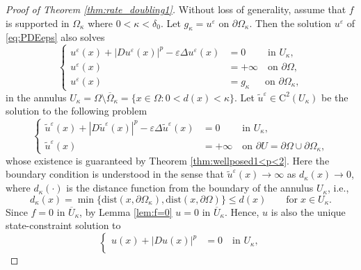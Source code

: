 \documentclass[12pt,reqno]{amsart}
\numberwithin{figure}{section}
\theoremstyle{plain}
\theoremstyle{remark}
\numberwithin{equation}{section}
\begin{document}
\begin{proof}[Proof of Theorem \ref{thm:rate_doubling1}] Without loss of generality, assume that $f$ is supported in $\Omega_\kappa$ where $0<\kappa < \delta_{0}$.
Let $g_\kappa = u^\varepsilon$ on $\partial\Omega_{\kappa}$. Then the solution $u^\varepsilon$ of \eqref{eq:PDEeps} also solves
\begin{equation*}
    \left\{
  \begin{aligned}
  u^\varepsilon(x) + |Du^\varepsilon(x)|^p-\varepsilon \Delta u^\varepsilon(x) &=0 \;\qquad \text{in } U_\kappa ,\\
  u^\varepsilon(x) &= +\infty \quad \text{on } \partial \Omega,\\
  u^\varepsilon(x) &= g_\kappa \;\;\quad \text{on } \partial \Omega_{\kappa},
    \end{aligned}
\right.
\end{equation*}
in the annulus $U_\kappa= \Omega \setminus \overline{\Omega}_{\kappa} = \{x\in \Omega: 0< d(x) < \kappa\}$. Let $\tilde{u}^\varepsilon\in \mathrm{C}^2(U_\kappa)$ be the solution to the following problem
\begin{equation*}
    \left\{
        \begin{aligned}
            \tilde{u}^\varepsilon(x) + |D\tilde{u}^\varepsilon(x)|^p-\varepsilon \Delta \tilde{u}^\varepsilon(x) &=0 \;\qquad \text{in } U_\kappa ,\\
            \tilde{u}^\varepsilon(x) &= +\infty \quad \text{on } \partial U = \partial \Omega\cup \partial \Omega_{\kappa},
        \end{aligned}
    \right.
\end{equation*}
whose existence is guaranteed by Theorem \ref{thm:wellposed1<p<2}.
Here the boundary condition is understood in the sense that $\tilde{u}^\varepsilon(x)\to \infty$ as $d_\kappa(x)\to 0$, where $d_\kappa(\cdot)$ is the distance function from the boundary of the annulus $U_\kappa$, i.e.,
\begin{equation*}
    d_\kappa(x) = \min \big\lbrace \mathrm{dist}(x,\partial \Omega_\kappa),\mathrm{dist}(x,\partial\Omega)  \big\rbrace \leq d(x) \qquad\text{for}\;x\in U_\kappa.
\end{equation*}
Since $f = 0$ in $\overline{U}_\kappa$, by Lemma \ref{lem:f=0} $u=0$ in $\overline{U}_\kappa$. Hence, $u$ is also the unique state-constraint solution to
\begin{equation*}
    \left\{
        \begin{aligned}
            u(x)+ |Du(x)|^p &=0 \quad \text{in } U_\kappa ,\\

\end{aligned}
\end{equation*}
\end{proof}
\end{document}
